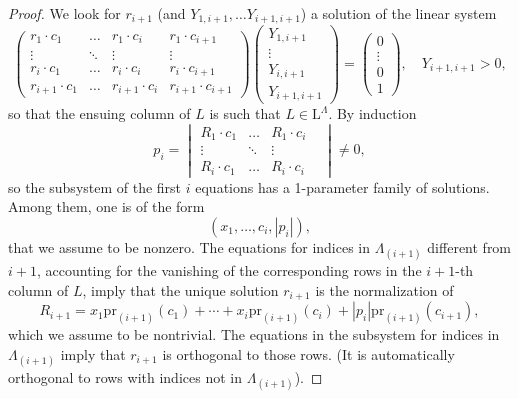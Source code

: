 \documentclass[reqno]{amsart}
\newcommand{\pr}{\mathrm{pr}}
\renewcommand{\L}{\mathrm{L}}
\theoremstyle{definition} %
\begin{document}
\begin{proof}
 We look for $r_{i+1}$ (and $Y_{1,i+1},\dots Y_{i+1,i+1}$) a solution
of the linear system
\[\begin{pmatrix} r_1\cdot c_1 &  \ldots & r_1\cdot c_i &  r_1\cdot c_{i+1} \\
\vdots  & \ddots & \vdots &\vdots \\
r_i\cdot c_1 & \ldots & r_i\cdot c_i & r_i\cdot c_{i+1}\\
r_{i+1}\cdot c_1 & \ldots & r_{i+1}\cdot c_i & r_{i+1}\cdot c_{i+1}
  \end{pmatrix}\begin{pmatrix} Y_{1,i+1} \\\vdots \\ Y_{i,i+1}\\ Y_{i+1,i+1}\end{pmatrix}=\begin{pmatrix} 0 \\\vdots \\ 0\\1\end{pmatrix},\quad Y_{i+1,i+1}>0,
   \]
  so that the ensuing column of $L$ is such that $L\in \L^\Lambda$.
By induction
\[p_i=\begin{vmatrix} R_1\cdot c_1 &  \ldots & R_1\cdot c_i \\
\vdots  & \ddots & \vdots \\
R_i\cdot c_1 & \ldots & R_i\cdot c_i & \end{vmatrix}\neq 0,\]
so the subsystem of the first $i$ equations has a 1-parameter family of solutions. Among them, one is of the form
\[(x_1,\dots,c_i,|p_i|),\]
that we assume to be nonzero.
The  equations for indices in $\Lambda_{(i+1)}$ different from $i+1$, accounting for the vanishing of the corresponding rows in the $i+1$-th column of $L$,  imply that the unique solution $r_{i+1}$ is the normalization of
\[R_{i+1}=x_1\pr_{(i+1)}(c_1)+\cdots+x_i\pr_{(i+1)}(c_i)+|p_i|\pr_{(i+1)}(c_{i+1}),\]
which we assume to be nontrivial.
 The equations in the subsystem for indices in $\Lambda_{(i+1)}$ imply that $r_{i+1}$ is orthogonal to those rows. (It is automatically orthogonal to rows with indices not in $\Lambda_{(i+1)}$).


\end{proof}
\end{document}
